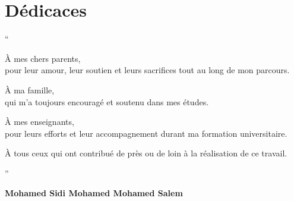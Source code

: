 ﻿\documentclass[12pt,a4paper]{report}
\begin{document}

\chapter*{Dédicaces}
\thispagestyle{empty}


\vspace{1.5cm}

{\fontsize{48}{58}\selectfont\textquotedblleft}

\vspace{0.4cm}

\begin{center}
\begin{minipage}{0.75\textwidth}
\centering\itshape\large

À mes chers parents,\\[4pt]
pour leur amour, leur soutien et leurs sacrifices tout au long de mon parcours.

\vspace{0.55cm}

À ma famille,\\[4pt]
qui m'a toujours encouragé et soutenu dans mes études.

\vspace{0.55cm}

À mes enseignants,\\[4pt]
pour leurs efforts et leur accompagnement durant ma formation universitaire.

\vspace{0.55cm}

À tous ceux qui ont contribué de près ou de loin à la réalisation de ce travail.

\end{minipage}
\end{center}

\vspace{0.4cm}

\begin{flushright}
{\fontsize{48}{58}\selectfont\textquotedblright}
\end{flushright}

\vspace{1.2cm}

\begin{flushright}
\large\textbf{Mohamed Sidi Mohamed Mohamed Salem}
\end{flushright}
\end{document}

